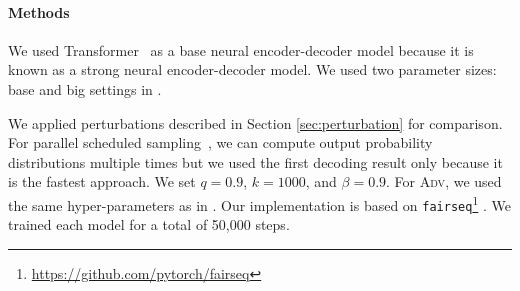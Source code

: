 \documentclass[11pt]{article}
\newcommand{\adv}{\textsc{Adv}}
\begin{document}
\paragraph{Methods}
We used Transformer~\cite{NIPS2017_7181} as a base neural encoder-decoder model because it is known as a strong neural encoder-decoder model.
We used two parameter sizes: base and big settings in .


We applied perturbations described in Section \ref{sec:perturbation} for comparison.
For parallel scheduled sampling~\cite{DBLP:journals/corr/abs-1906-04331}, we can compute output probability distributions multiple times but we used the first decoding result only because it is the fastest approach.
We set $q = 0.9$, $k = 1000$, and $\beta = 0.9$.
For \adv{}, we used the same hyper-parameters as in .
Our implementation is based on \texttt{fairseq}\footnote{\href{https://github.com/pytorch/fairseq}{https://github.com/pytorch/fairseq}} \cite{ott-etal-2019-fairseq}.
We trained each model for a total of 50,000 steps.
\end{document}
